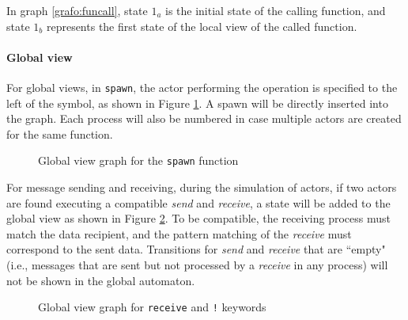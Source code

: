 In graph \ref{grafo:funcall}, state $1_a$ is the initial state of the calling function,  
and state $1_b$ represents the first state of the local view of the called function.

\paragraph{Global view}
For global views, in \texttt{spawn}, the actor performing the operation is specified to  
the left of the symbol, as shown in Figure \ref{grafo:globspawn}. A spawn will be  
directly inserted into the graph. Each process will also be numbered in case multiple  
actors are created for the same function.

\begin{figure}[ht!]
    \centering
    \caption{Global view graph for the \texttt{spawn} function}
    \label{grafo:globspawn}
\end{figure}

For message sending and receiving, during the simulation of actors, if two actors are  
found executing a compatible \textit{send} and \textit{receive}, a state will be added  
to the global view as shown in Figure \ref{grafo:sendrecv}. To be compatible, the  
receiving process must match the data recipient, and the pattern matching of the  
\textit{receive} must correspond to the sent data. Transitions for \textit{send} and  
\textit{receive} that are ``empty" (i.e., messages that are sent but not processed by a  
\textit{receive} in any process) will not be shown in the global automaton.

\begin{figure}[ht!]
    \centering
    \caption{Global view graph for \texttt{receive} and \texttt{!} keywords}
    \label{grafo:sendrecv}
\end{figure}


